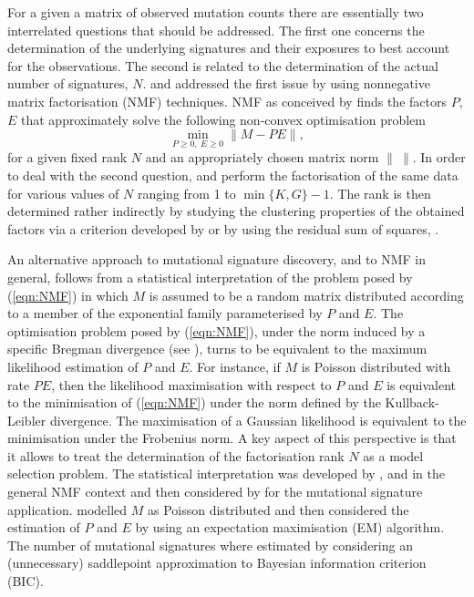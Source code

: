 \documentclass{bioinfo}
\begin{document}
For a given a matrix of observed mutation counts there are essentially
two interrelated questions that should be addressed. The first one
concerns the determination of the underlying signatures and their
exposures to best account for the observations. The second is related
to the determination of the actual number of signatures,
$N$. \cite{NCell} and \cite{A} addressed the first issue by using
nonnegative matrix factorisation (NMF) techniques.  NMF as conceived
by \cite{LS} finds the factors $P$, $E$ that approximately solve the
following non-convex optimisation problem
\begin{equation}
 \label{eqn:NMF}
  \min_{P\geqslant 0,\ E\geqslant 0}\|M - PE\|,
\end{equation}
for a given fixed rank $N$ and an appropriately chosen matrix norm
$\|\ \|$.  In order to deal with the second question, \cite{NCell} and
\cite{A} perform the factorisation of the same data for various
values of $N$ ranging from 1 to $\min\{K, G\}-1$. The rank is then
determined rather indirectly by studying the clustering properties of
the obtained factors via a criterion developed by \cite{BTGM} or by 
using the residual sum of squares, \cite{HMSG}.


An alternative approach to mutational signature discovery, and to NMF
in general, follows from a statistical interpretation of the problem
posed by (\ref{eqn:NMF}) in which $M$ is assumed to be a random matrix
distributed according to a member of the exponential family
parameterised by $P$ and $E$. The optimisation problem posed by
(\ref{eqn:NMF}), under the norm induced by a specific Bregman
divergence (see \citealp{BMD}), turns to be equivalent to the maximum
likelihood estimation of $P$ and $E$.  For instance, if $M$ is Poisson
distributed with rate $PE$, then the likelihood maximisation with
respect to $P$ and $E$ is equivalent to the minimisation of
(\ref{eqn:NMF}) under the norm defined by the Kullback-Leibler
divergence. The maximisation of a Gaussian likelihood is equivalent to
the minimisation under the Frobenius norm. A key aspect of this
perspective is that it allows to treat the determination of the
factorisation rank $N$ as a model selection problem. The statistical
interpretation was developed by \cite{C}, \cite{FC} and \cite{SWK} in
the general NMF context and then considered by \cite{FICMV} for the
mutational signature application. \cite{FICMV} modelled $M$ as Poisson
distributed and then considered the estimation of $P$ and $E$ by using
an expectation maximisation (EM) algorithm. The number of mutational
signatures where estimated by considering an (unnecessary) saddlepoint
approximation to Bayesian information criterion (BIC).
\end{document}
